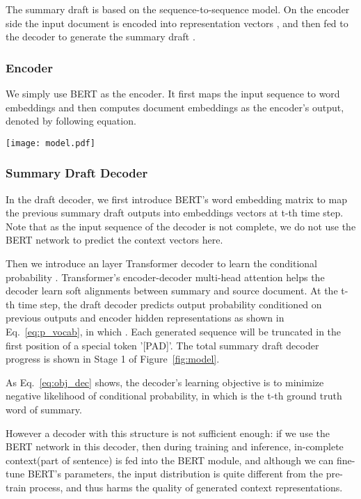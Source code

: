 \documentclass{article}
\begin{document}
The summary draft is based on the sequence-to-sequence model. On the encoder side the input document  is encoded into representation vectors , and then fed to the decoder to generate the summary draft .

\subsubsection{Encoder}

We simply use BERT as the encoder. It first maps the input sequence to word embeddings and then computes document embeddings as the encoder's output, denoted by following equation.



\begin{figure*}[htbp]
	\centering
	\small
	\texttt{[image: model.pdf]}
	\makeatletter\def\@captype{figure}\makeatother \caption{Model Overview, N represents decoder layer number and L represents summary length.\label{fig:model}}
\end{figure*}

\subsubsection{Summary Draft Decoder}

In the draft decoder, we first introduce BERT's word embedding matrix to map the previous summary draft outputs  into embeddings vectors  at t-th time step. Note that as the input sequence of the decoder is not complete, we do not use the BERT network to predict the context vectors here.

Then we introduce an  layer Transformer decoder to learn the conditional probability . Transformer's encoder-decoder multi-head attention helps the decoder learn soft alignments between summary and source document. At the t-th time step, the draft decoder predicts output probability conditioned on previous outputs and encoder hidden representations as shown in Eq.~\eqref{eq:p_vocab}, in which . Each generated sequence will be truncated in the first position of a special token '[PAD]'. The total summary draft decoder progress is shown in Stage 1 of Figure~\ref{fig:model}.



As Eq.~\eqref{eq:obj_dec} shows, the decoder's learning objective is to minimize negative likelihood of conditional probability, in which  is the t-th ground truth word of summary. 

However a decoder with this structure is not sufficient enough: if we use the BERT network in this decoder, then during training and inference, in-complete context(part of sentence) is fed into the BERT module, and although we can fine-tune BERT's parameters, the input distribution is quite different from the pre-train process, and thus harms the quality of generated context representations.
\end{document}
